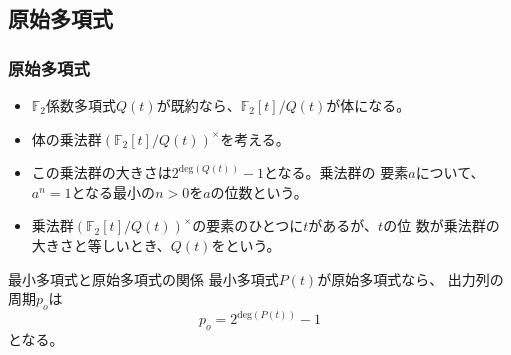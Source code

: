 \documentclass[cjk, dvips, handout, trans, xcolor=dvipsnames]{beamer}
\def\F2{{\mathbb F}_2}
\begin{document}
\subsection{原始多項式}
\begin{frame}[t]
  \frametitle{原始多項式}

  \begin{itemize}
  \item $\F2$係数多項式$Q(t)$が既約なら、$\F2[t]/Q(t)$が体になる。
  \item 体の乗法群$(\F2[t]/Q(t))^{\times}$を考える。
  \item この乗法群の大きさは$2^{\mathrm{deg}(Q(t))}-1$となる。乗法群の
    要素$a$について、$a^n = 1$となる最小の$n>0$を$a$の位数という。
  \item 乗法群$(\F2[t]/Q(t))^{\times}$の要素のひとつに$t$があるが、$t$の位
    数が乗法群の大きさと等しいとき、$Q(t)$をという。
  \end{itemize}

  \begin{block}{最小多項式と原始多項式の関係}
    最小多項式$P(t)$が原始多項式なら、
    出力列の周期$p_o$は
    \[
    p_o = 2^{\mathrm{deg}(P(t))}-1
    \]
    となる。
  \end{block}

\end{frame}
\end{document}
